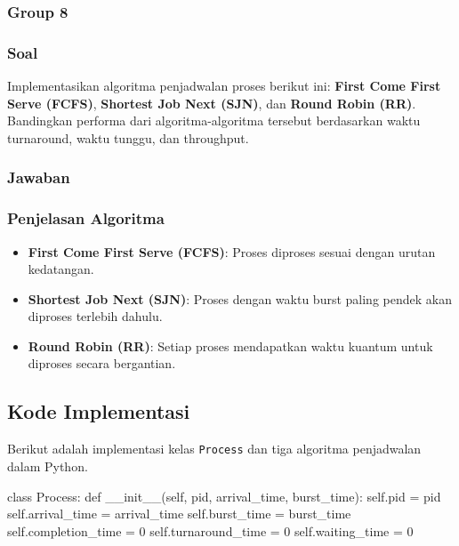 \documentclass[12pt]{article}
\begin{document}
\begin{itemiz;[e}
\subsubsection{Group 8}
\subsubsection{Soal}
Implementasikan algoritma penjadwalan proses berikut ini: \textbf{First Come First Serve (FCFS)}, \textbf{Shortest Job Next (SJN)}, dan \textbf{Round Robin (RR)}. Bandingkan performa dari algoritma-algoritma tersebut berdasarkan waktu turnaround, waktu tunggu, dan throughput.

\subsubsection{Jawaban}

\subsubsection{Penjelasan Algoritma}

\begin{itemize}
    \item \textbf{First Come First Serve (FCFS)}: Proses diproses sesuai dengan urutan kedatangan.
    \item \textbf{Shortest Job Next (SJN)}: Proses dengan waktu burst paling pendek akan diproses terlebih dahulu.
    \item \textbf{Round Robin (RR)}: Setiap proses mendapatkan waktu kuantum untuk diproses secara bergantian.
\end{itemize}

\subsection{Kode Implementasi}

Berikut adalah implementasi kelas \texttt{Process} dan tiga algoritma penjadwalan dalam Python.

\begin{python}[language=Python, caption=Kelas Process]
class Process:
    def __init__(self, pid, arrival_time, burst_time):
        self.pid = pid
        self.arrival_time = arrival_time
        self.burst_time = burst_time
        self.completion_time = 0
        self.turnaround_time = 0
        self.waiting_time = 0
\end{python}


\end{itemiz;[e}
\end{document}
